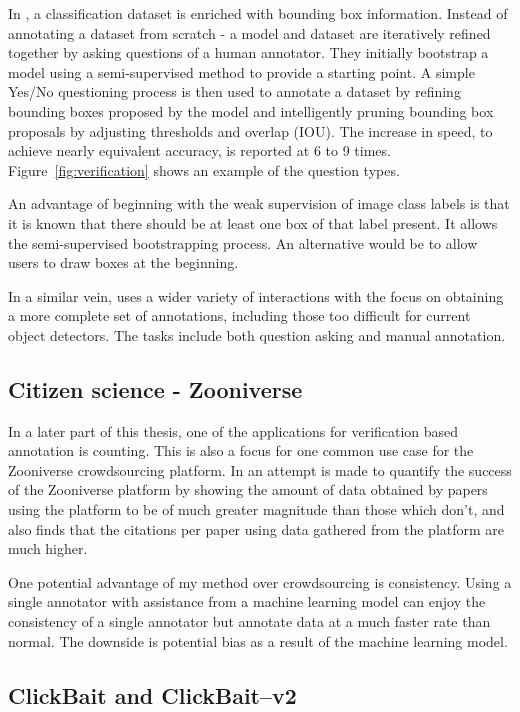 In \cite{Papadopoulos2016}, a classification dataset is enriched with bounding box information. Instead of annotating a dataset from scratch - a model and dataset are iteratively refined together by asking questions of a human annotator. They initially bootstrap a model using a semi-supervised method  \cite{Cinbis2017} to provide a starting point. A simple Yes/No questioning process is then used to annotate a dataset by refining bounding boxes proposed by the model and intelligently pruning bounding box proposals by adjusting thresholds and overlap (\gls{IOU}). The increase in speed, to achieve nearly equivalent accuracy, is reported at 6 to 9 times.  Figure~\ref{fig:verification} shows an example of the question types.

An advantage of beginning with the weak supervision of image class labels is that it is known that there should be at least one box of that label present. It allows the semi-supervised bootstrapping process. An alternative would be to allow users to draw boxes at the beginning. 

In a similar vein, \cite{Russakovsky2015a} uses a wider variety of interactions with the focus on obtaining a more complete set of annotations, including those too difficult for current object detectors. The tasks include both question asking and manual annotation.


\subsection{Citizen science - Zooniverse \texorpdfstring{\cite{Zooniverse}}{}}

In a later part of this thesis, one of the applications for verification based annotation is counting. This is also a focus for one common use case for the Zooniverse crowdsourcing platform. In \cite{Watson2018} an attempt is made to quantify the success of the Zooniverse platform by showing the amount of data obtained by papers using the platform to be of much greater magnitude than those which don't, and also finds that the citations per paper using data gathered from the platform are much higher. 

One potential advantage of my method over crowdsourcing is consistency. Using a single annotator with assistance from a machine learning model can enjoy the consistency of a single annotator but annotate data at a much faster rate than normal. The downside is potential bias as a result of the machine learning model.

\subsection{ClickBait and ClickBait--v2 \texorpdfstring{\cite{Teng2017, Teng2018}}{}}

